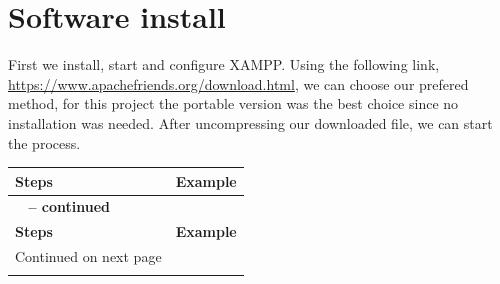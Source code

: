 \documentclass[11pt,a4paper]{report}
\begin{document}
    \section{Software install}
        \begin{flushleft}
            First we install, start and configure XAMPP. Using the following link, \href{https://www.apachefriends.org/download.html}{https://www.apachefriends.org/download.html}, we can choose our prefered method, for this project the portable version was the best choice since no installation was needed. After uncompressing our downloaded file, we can start the process.
                \begin{center}
                    \begin{longtable}{ m{5cm} l }
                        \textbf{Steps} & \textbf{Example} \\
                        \hline
                        \endfirsthead
                        {{\bfseries \tablename\ \thetable{} -- continued}} \\
                        \textbf{Steps} & \textbf{Example} \\
                        \hline
                        \endhead
                        \hline Continued on next page \\
                        \endfoot
                        \endlastfoot


\end{longtable}
\end{center}
\end{flushleft}
\end{document}
